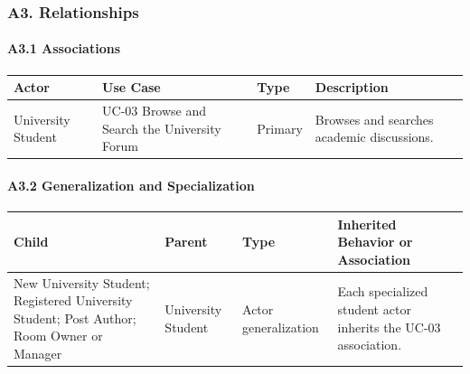 \documentclass[12pt]{article}
\renewcommand{\baselinestretch}{1.5}
\begin{document}
\hypertarget{sec:a3-relationships}{}
\subsubsection*{A3. Relationships}
\par\medskip

\hypertarget{sec:a3-1-associations}{}
\paragraph*{A3.1 Associations}
\par\medskip

\begingroup
\small
\renewcommand{\baselinestretch}{1.0}\selectfont
\renewcommand{\arraystretch}{1.15}
\setlength{\tabcolsep}{6pt}
\begin{longtable}{|>{\raggedright\arraybackslash}p{}|>{\raggedright\arraybackslash}p{}|>{\raggedright\arraybackslash}p{}|>{\raggedright\arraybackslash}p{}|}
\hline
\textbf{Actor} & \textbf{Use Case} & \textbf{Type} & \textbf{Description} \\ \hline
\endhead
University Student & UC-03 Browse and Search the University Forum & Primary & Browses and searches academic discussions. \\ \hline
\end{longtable}
\endgroup
\par\medskip

\hypertarget{sec:a3-2-generalization-and-specialization}{}
\paragraph*{A3.2 Generalization and Specialization}
\par\medskip

\begingroup
\small
\renewcommand{\baselinestretch}{1.0}\selectfont
\renewcommand{\arraystretch}{1.15}
\setlength{\tabcolsep}{6pt}
\begin{longtable}{|>{\raggedright\arraybackslash}p{}|>{\raggedright\arraybackslash}p{}|>{\raggedright\arraybackslash}p{}|>{\raggedright\arraybackslash}p{}|}
\hline
\textbf{Child} & \textbf{Parent} & \textbf{Type} & \textbf{Inherited Behavior or Association} \\ \hline
\endhead
New University Student; Registered University Student; Post Author; Room Owner or Manager & University Student & Actor generalization & Each specialized student actor inherits the UC-03 association. \\ \hline
\end{longtable}
\endgroup
\par\medskip
\end{document}
